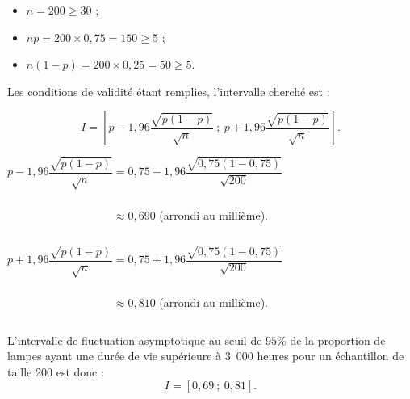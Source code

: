 \begin{corrige}
\begin{enumerate}
          \par
          \begin{itemize}
               \item $n=200 \geqslant 30$ ;
               \item $np=200 \times 0,75=150 \geqslant 5$ ;
               \item $n(1-p)=200 \times 0,25=50 \geqslant 5$.
          \end{itemize}
          \par
          Les conditions de validité étant remplies, l'intervalle cherché est :
          \par
          \[ I=\left[p-1,96\dfrac{\sqrt{p(1-p)}}{\sqrt{n}}~;~p+1,96\dfrac{\sqrt{p(1-p)}}{\sqrt{n}}\right]. \]
          \par
          \vspace{1cm}
          \par
          $p-1,96\dfrac{\sqrt{p(1-p)}}{\sqrt{n}}=0,75-1,96\dfrac{\sqrt{0,75(1-0,75)}}{\sqrt{200}}$
          \par
          $\phantom{p-1,96\dfrac{\sqrt{p(1-p)}}{\sqrt{n}}} \approx 0,690 $ (arrondi au millième).
          \par
          $p+1,96\dfrac{\sqrt{p(1-p)}}{\sqrt{n}}=0,75+1,96\dfrac{\sqrt{0,75(1-0,75)}}{\sqrt{200}}$
          \par
          $\phantom{p+1,96\dfrac{\sqrt{p(1-p)}}{\sqrt{n}}} \approx 0,810 $ (arrondi au millième).
          \par
          L'intervalle de fluctuation asymptotique au seuil de $95\%$ de la proportion de lampes ayant une durée de vie supérieure à 3\ 000 heures pour un échantillon de taille 200 est donc :
          \[ I=[0,69~;~0,81]. \]
\end{enumerate}
\end{corrige}

